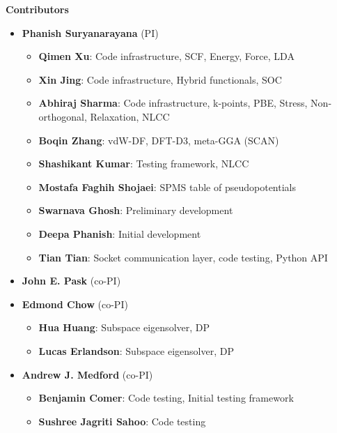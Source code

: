   \begin{frame}[allowframebreaks]{\textbf{Contributors}} \label{Contributors}

	\begin{itemize}
	\item \textbf{Phanish Suryanarayana} (PI)
	\begin{itemize}
 	    \item \textbf{Qimen Xu}: Code infrastructure, SCF, Energy, Force, LDA \\  
        \item \textbf{Xin Jing}: Code infrastructure, Hybrid functionals, SOC \\  
 	    \item \textbf{Abhiraj Sharma}: Code infrastructure, k-points, PBE, Stress, Non-orthogonal, Relaxation, NLCC \\   
 	    \item \textbf{Boqin Zhang}: vdW-DF, DFT-D3, meta-GGA (SCAN) \\  
 	    \item \textbf{Shashikant Kumar}: Testing framework, NLCC \\  
            \item \textbf{Mostafa Faghih Shojaei}: SPMS table of pseudopotentials \\ 
            \item \textbf{Swarnava Ghosh}: Preliminary development \\
            \item \textbf{Deepa Phanish}: Initial development
            \item \textbf{Tian Tian}: Socket communication layer, code testing, Python API\\ 
 	\end{itemize}
    \item \textbf{John E. Pask} (co-PI)
    \item \textbf{Edmond Chow} (co-PI)
    \begin{itemize}
        \item \textbf{Hua Huang}: Subspace eigensolver, DP
        \item \textbf{Lucas Erlandson}: Subspace eigensolver, DP
    \end{itemize}
    \item \textbf{Andrew J. Medford} (co-PI)
    \begin{itemize}
        \item \textbf{Benjamin Comer}: Code testing, Initial testing framework
        \item \textbf{Sushree Jagriti Sahoo}: Code testing
    \end{itemize}
 	\end{itemize}
  
\end{frame}


